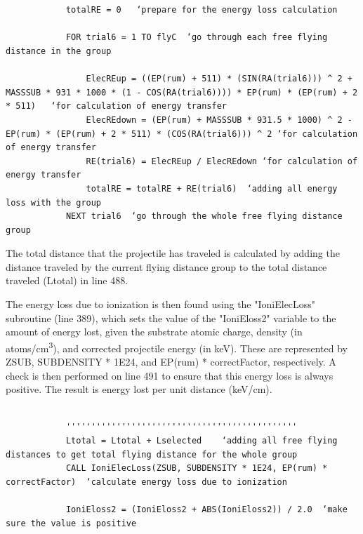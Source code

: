\documentclass[10pt, reqno]{exam}
\begin{document}
\begin{verbatim}
    
    
            totalRE = 0   ‘prepare for the energy loss calculation 
    
            FOR trial6 = 1 TO flyC  ‘go through each free flying distance in the group
    
                ElecREup = ((EP(rum) + 511) * (SIN(RA(trial6))) ^ 2 + MASSSUB * 931 * 1000 * (1 - COS(RA(trial6)))) * EP(rum) * (EP(rum) + 2 * 511)   ‘for calculation of energy transfer 
                ElecREdown = (EP(rum) + MASSSUB * 931.5 * 1000) ^ 2 - EP(rum) * (EP(rum) + 2 * 511) * (COS(RA(trial6))) ^ 2 ‘for calculation of energy transfer
                RE(trial6) = ElecREup / ElecREdown ‘for calculation of energy transfer
                totalRE = totalRE + RE(trial6)  ‘adding all energy loss with the group
            NEXT trial6  ‘go through the whole free flying distance group 
\end{verbatim}

The total distance that the projectile has traveled is calculated by adding the distance traveled by the current flying distance group to the total distance traveled (Ltotal) in line 488. \par

The energy loss due to ionization is then found using the "IoniElecLoss" subroutine (line 389), which sets the value of the "IoniEloss2" variable to the amount of energy lost, given the substrate atomic charge, density (in \si{atoms/cm^3}), and corrected projectile energy (in keV). These are represented by ZSUB, SUBDENSITY * 1E24, and EP(rum) * correctFactor, respectively. A check is then performed on line 491 to ensure that this energy loss is always positive. The result is energy lost per unit distance (\si{keV/cm}).\par

\begin{verbatim}
    
            ''''''''''''''''''''''''''''''''''''''''''''''
            Ltotal = Ltotal + Lselected    ‘adding all free flying distances to get total flying distance for the whole group 
            CALL IoniElecLoss(ZSUB, SUBDENSITY * 1E24, EP(rum) * correctFactor)  ‘calculate energy loss due to ionization 
    
            IoniEloss2 = (IoniEloss2 + ABS(IoniEloss2)) / 2.0  ‘make sure the value is positive 
\end{verbatim}
\end{document}
